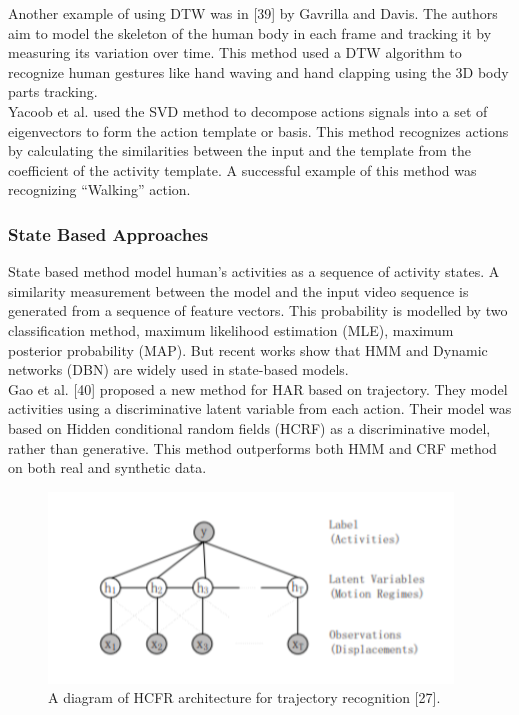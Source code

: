 Another example of using DTW was in [39] by Gavrilla and Davis. The authors aim to model the skeleton of the human body in each frame and tracking it by measuring its variation over time. This method used a DTW algorithm to recognize human gestures like hand waving and hand clapping using the 3D body parts tracking.\\

Yacoob et al. used the SVD method to decompose actions signals into a set of eigenvectors to form the action template or basis. This method recognizes actions by calculating the similarities between the input and the template from the coefficient of the activity template. A successful example of this method was recognizing “Walking” action.

\subsubsection{State Based Approaches}
\hspace{5mm} State based method model human’s activities as a sequence of activity states. A similarity measurement between the model and the input video sequence is generated from a sequence of feature vectors. This probability is modelled by two classification method, maximum likelihood estimation (MLE), maximum posterior probability (MAP). But recent works show that HMM and Dynamic networks (DBN) are widely used in state-based models.\\

Gao et al. [40] proposed a new method for HAR based on trajectory. They model activities using a discriminative latent variable from each action. Their model was based on Hidden conditional random fields (HCRF) as a discriminative model, rather than generative. This method outperforms both HMM and CRF method on both real and synthetic data.
\begin{figure}[ht]
\centering
\includegraphics{Figures/HCRF}
\decoRule
\caption[A diagram of HCFR architecture for trajectory recognition "27".]{A diagram of HCFR architecture for trajectory recognition [27].}
\label{fig:la}
\end{figure}\\

